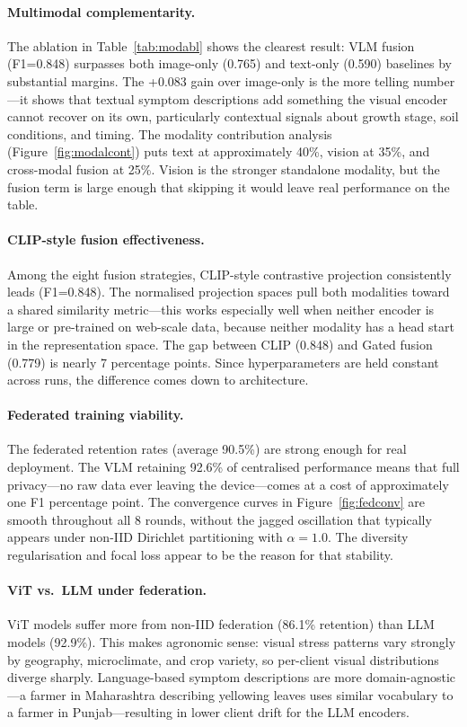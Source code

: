 \documentclass[12pt, a4paper, oneside]{Thesis}
\begin{document}
\paragraph{Multimodal complementarity.}
The ablation in Table~\ref{tab:modabl} shows the clearest result: VLM fusion (F1=0.848) surpasses both image-only (0.765) and text-only (0.590) baselines by substantial margins. The +0.083 gain over image-only is the more telling number---it shows that textual symptom descriptions add something the visual encoder cannot recover on its own, particularly contextual signals about growth stage, soil conditions, and timing. The modality contribution analysis (Figure~\ref{fig:modalcont}) puts text at approximately 40\%, vision at 35\%, and cross-modal fusion at 25\%. Vision is the stronger standalone modality, but the fusion term is large enough that skipping it would leave real performance on the table.

\paragraph{CLIP-style fusion effectiveness.}
Among the eight fusion strategies, CLIP-style contrastive projection consistently leads (F1=0.848). The normalised projection spaces pull both modalities toward a shared similarity metric---this works especially well when neither encoder is large or pre-trained on web-scale data, because neither modality has a head start in the representation space. The gap between CLIP (0.848) and Gated fusion (0.779) is nearly 7 percentage points. Since hyperparameters are held constant across runs, the difference comes down to architecture.

\paragraph{Federated training viability.}
The federated retention rates (average 90.5\%) are strong enough for real deployment. The VLM retaining 92.6\% of centralised performance means that full privacy---no raw data ever leaving the device---comes at a cost of approximately one F1 percentage point. The convergence curves in Figure~\ref{fig:fedconv} are smooth throughout all 8 rounds, without the jagged oscillation that typically appears under non-IID Dirichlet partitioning with $\alpha{=}1.0$. The diversity regularisation and focal loss appear to be the reason for that stability.

\paragraph{ViT vs.\ LLM under federation.}
ViT models suffer more from non-IID federation (86.1\% retention) than LLM models (92.9\%). This makes agronomic sense: visual stress patterns vary strongly by geography, microclimate, and crop variety, so per-client visual distributions diverge sharply. Language-based symptom descriptions are more domain-agnostic---a farmer in Maharashtra describing yellowing leaves uses similar vocabulary to a farmer in Punjab---resulting in lower client drift for the LLM encoders.
\end{document}
